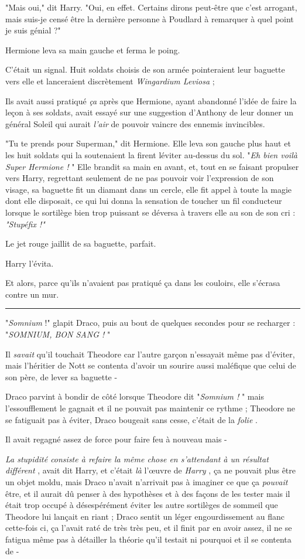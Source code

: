 "Mais oui," dit Harry. "Oui, en effet. Certains dirons peut-être que c'est arrogant, mais suis-je censé être la dernière personne à Poudlard à remarquer à quel point je suis génial ?"

Hermione leva sa main gauche et ferma le poing.

C'était un signal. Huit soldats choisis de son armée pointeraient leur baguette vers elle et lanceraient discrètement \emph{Wingardium Leviosa} ;

Ils avait aussi pratiqué \emph{ça}  après que Hermione, ayant abandonné l'idée de faire la leçon à ses soldats, avait essayé sur une suggestion d'Anthony de leur donner un général Soleil qui aurait \emph{l'air}  de pouvoir vaincre des ennemis invincibles.

"Tu te prends pour Superman," dit Hermione. Elle leva son gauche plus haut et les huit soldats qui la soutenaient la firent léviter au-dessus du sol. "\emph{Eh bien voilà Super Hermione !} " Elle brandit sa main en avant, et, tout en se faisant propulser vers Harry, regrettant seulement de ne pas pouvoir voir l'expression de son visage, sa baguette fit un diamant dans un cercle, elle fit appel à toute la magie dont elle disposait, ce qui lui donna la sensation de toucher un fil conducteur lorsque le sortilège bien trop puissant se déversa à travers elle au son de son cri : \emph{"Stupéfix !"} 

Le jet rouge jaillit de sa baguette, parfait.

Harry l'évita.

Et alors, parce qu'ils n'avaient pas pratiqué ça dans les couloirs, elle s'écrasa contre un mur.
\par\noindent\rule{\textwidth}{0.4pt}
"\emph{Somnium}  !" glapit Draco, puis au bout de quelques secondes pour se recharger : "\emph{SOMNIUM, BON SANG !} "

Il \emph{savait}  qu'il touchait Theodore car l'autre garçon n'essayait même pas d'éviter, mais l'héritier de Nott se contenta d'avoir un sourire aussi maléfique que celui de son père, de lever sa baguette -

Draco parvint à bondir de côté lorsque Theodore dit "\emph{Somnium !} " mais l'essoufflement le gagnait et il ne pouvait pas maintenir ce rythme ; Theodore ne se fatiguait pas à éviter, Draco bougeait sans cesse, c'était de la \emph{folie} .

Il avait regagné assez de force pour faire feu à nouveau mais -

\emph{La stupidité consiste à refaire la même chose en s'attendant à un résultat différent} , avait dit Harry, et c'était \emph{là}  l'œuvre de \emph{Harry} , ça ne pouvait plus être un objet moldu, mais Draco n'avait n'arrivait pas à imaginer ce que ça \emph{pouvait}  être, et il aurait dû penser à des hypothèses et à des façons de les tester mais il était trop occupé à désespérément éviter les autre sortilèges de sommeil que Theodore lui lançait en riant ; Draco sentit un léger engourdissement au flanc cette-fois ci, ça l'avait raté de très très peu, et il finit par en avoir assez, il ne se fatigua même pas à détailler la théorie qu'il testait ni pourquoi et il se contenta de -

